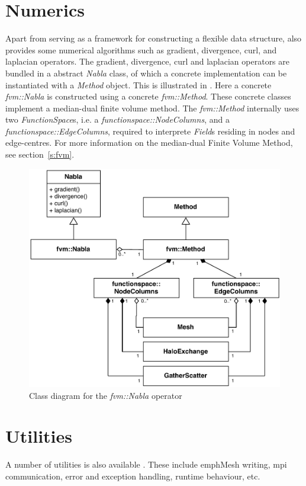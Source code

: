 \section{Numerics}
%
Apart from serving as a framework for constructing a flexible data structure,
\Atlas also provides some numerical algorithms such as gradient, divergence,
curl, and laplacian operators.
%
The gradient, divergence, curl and laplacian operators are bundled in a
abstract \emph{Nabla} class, of which a concrete implementation can be
instantiated with a \emph{Method} object. This is illustrated in
. Here a concrete \emph{fvm::Nabla} is constructed using a
concrete \emph{fvm::Method}. These concrete classes implement a median-dual
finite volume method. The \emph{fvm::Method} internally uses two
\emph{FunctionSpace}s, i.e. a \emph{functionspace::NodeColumns}, and a
\emph{functionspace::EdgeColumns}, required to interprete \emph{Field}s
residing in nodes and edge-centres. For more information on the median-dual
Finite Volume Method, see section~\ref{s:fvm}.
%
\begin{figure}
\centering
\includegraphics[scale=0.5]{imgs/numerics.pdf}
\caption{Class diagram for the \emph{fvm::Nabla} operator
\label{fig:numerics}}
\end{figure}
%
\section{Utilities}
%
A number of utilities is also available \Atlas. These include 
emph{Mesh}
writing, mpi communication, error and exception 
handling, runtime behaviour, etc.
%

